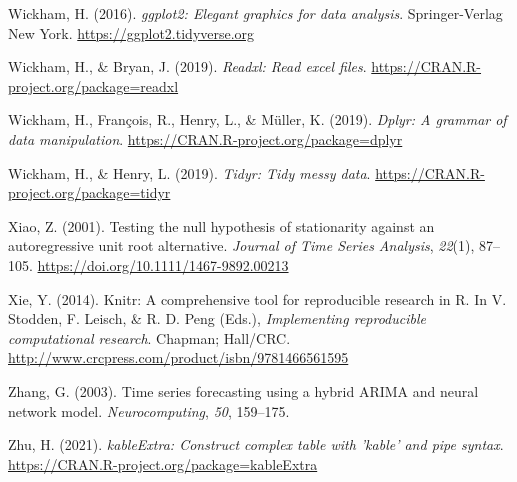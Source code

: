 \documentclass[
]{article}
\newlength{\cslhangindent}
\newlength{\cslentryspacingunit} %
\newenvironment{CSLReferences}[2] %
 {%
  \setlength{\parindent}{0pt}
  \ifodd #1
  \let\oldpar\par
  \def\par{\hangindent=\cslhangindent\oldpar}
  \fi
  \setlength{\parskip}{#2\cslentryspacingunit}
 }%
 {}
\begin{document}
\begin{CSLReferences}{1}{0}
\leavevmode{}%
Wickham, H. (2016). \emph{ggplot2: Elegant graphics for data analysis}.
Springer-Verlag New York. \url{https://ggplot2.tidyverse.org}

\leavevmode{}%
Wickham, H., \& Bryan, J. (2019). \emph{Readxl: Read excel files}.
\url{https://CRAN.R-project.org/package=readxl}

\leavevmode{}%
Wickham, H., François, R., Henry, L., \& Müller, K. (2019). \emph{Dplyr:
A grammar of data manipulation}.
\url{https://CRAN.R-project.org/package=dplyr}

\leavevmode{}%
Wickham, H., \& Henry, L. (2019). \emph{Tidyr: Tidy messy data}.
\url{https://CRAN.R-project.org/package=tidyr}

\leavevmode{}%
Xiao, Z. (2001). Testing the null hypothesis of stationarity against an
autoregressive unit root alternative. \emph{Journal of Time Series
Analysis}, \emph{22}(1), 87--105.
\url{https://doi.org/10.1111/1467-9892.00213}

\leavevmode{}%
Xie, Y. (2014). Knitr: A comprehensive tool for reproducible research in
{R}. In V. Stodden, F. Leisch, \& R. D. Peng (Eds.), \emph{Implementing
reproducible computational research}. Chapman; Hall/CRC.
\url{http://www.crcpress.com/product/isbn/9781466561595}

\leavevmode{}%
Zhang, G. (2003). Time series forecasting using a hybrid ARIMA and
neural network model. \emph{Neurocomputing}, \emph{50}, 159--175.

\leavevmode{}%
Zhu, H. (2021). \emph{kableExtra: Construct complex table with 'kable'
and pipe syntax}. \url{https://CRAN.R-project.org/package=kableExtra}

\end{CSLReferences}
\end{document}
